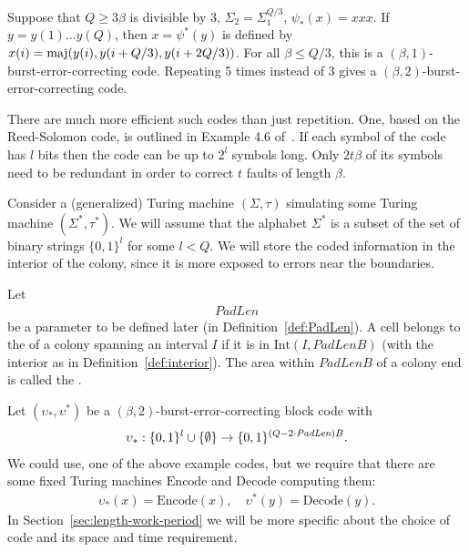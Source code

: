 \documentclass[11pt]{memoir}
\theoremstyle{definition} %
\renewcommand{\le}{\leq}
\renewcommand{\ge}{\geq}
\def\B{B}
\newcommand{\Int}{\mathrm{Int}} %
\newcommand{\Q}{Q} %
\newcommand{\Decode}{\mathrm{Decode}}
\newcommand{\Encode}{\mathrm{Encode}}
\newcommand{\PadLen}{\mathit{PadLen}} %
\begin{document}
\begin{example}\label{xpl:tripling}
  Suppose that \( \Q\ge 3\beta \) is divisible by 3,
  \( \Sigma_{2}=\Sigma_{1}^{\Q/3} \), \( \psi_{*}(x)=xxx \).
  If \( y=y(1)\dots y(\Q) \), then \( x=\psi^{*}(y) \) is defined by
    \( x(i)=\maj(y(i),y(i+\Q/3),y(i+2\Q/3)) \).
    For all \( \beta\le \Q/3 \), this is a
    \( (\beta,1) \)-burst-error-correcting code.
    Repeating 5 times instead of 3 gives a \( (\beta,2) \)-burst-error-correcting
    code.
  \end{example}

  \begin{example}\label{xpl:Reed-Solomon}
    There are much more efficient such codes than just repetition.
    One, based on the Reed-Solomon code, is outlined in Example 4.6
    of~\cite{GacsSorg01}.
    If each symbol of the code has \( l \) bits then the code can be up to \( 2^{l} \) symbols long.
    Only \( 2 t\beta \) of its symbols need to be redundant in order
    to correct \( t \) faults of length \( \beta \).
  \end{example}

Consider a (generalized) Turing machine 
\( (\Sigma,\tau) \) simulating some Turing machine \( (\Sigma^{*},\tau^{*}) \).
We will assume that the alphabet \( \Sigma^{*} \) is a subset of the set of  binary strings
\( \{0,1\}^{l} \) for some \( l<\Q \).
We will store the coded information in the interior of the colony, since it is more exposed 
to errors near the boundaries.

\begin{definition}\label{def:colony-interior}
Let 
\begin{align*}
  \PadLen 
\end{align*}
be a parameter to be defined later (in Definition~\ref{def:PadLen}).
A cell belongs to the  of a colony spanning an interval \( I \)
if it is in \( \Int(I,\PadLen\B) \) (with the interior as in Definition~\ref{def:interior}).
The area within \( \PadLen\B \) of a colony end is called the .
\end{definition}

Let \( (\upsilon_{*}, \upsilon^{*}) \) be a \( (\beta,2) \)-burst-error-correcting block code
with
\begin{align*}
  \upsilon_{*}: \{0,1\}^{l} \cup \set{\emptyset}
   \to\{0,1\}^{(\Q-2\cdot\PadLen)\B}.
\end{align*}
We could use, one of the above example codes, 
but we require that there are some fixed Turing machines
\( \Encode \) and \( \Decode \) computing them:
 \begin{align*}
   \upsilon_{*}(x)=\Encode(x),\quad 
   \upsilon^{*}(y)=\Decode( y).
 \end{align*}
 In Section~\ref{sec:length-work-period} we will be more specific about the choice of code
 and its space and time requirement.
\end{document}
